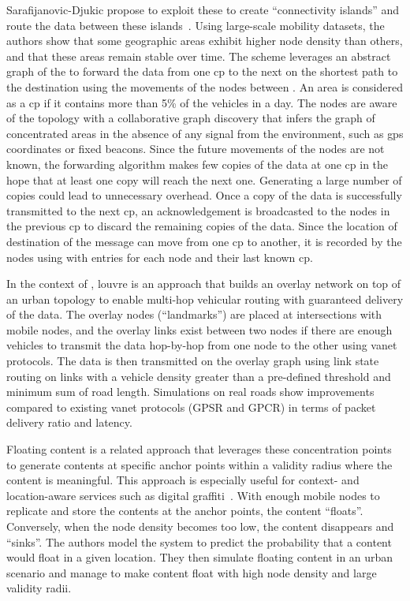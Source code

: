 Sarafijanovic-Djukic \etal propose to exploit these  to create ``connectivity islands'' and route the data between these islands~\cite{sarafijanovic2006island}. Using large-scale mobility datasets, the authors show that some geographic areas exhibit higher node density than others, and that these areas remain stable over time. The scheme leverages an abstract graph of the  to forward the data from one \acrshort{cp} to the next on the shortest path to the destination using the movements of the nodes between . An area is considered as a \acrshort{cp} if it contains more than 5\% of the vehicles in a day. The nodes are aware of the topology with a collaborative graph discovery that infers the graph of concentrated areas in the absence of any signal from the environment, such as \acrshort{gps} coordinates or fixed beacons. Since the future movements of the nodes are not known, the forwarding algorithm makes few copies of the data at one \acrshort{cp} in the hope that at least one copy will reach the next one. Generating a large number of copies could lead to unnecessary overhead. Once a copy of the data is successfully transmitted to the next \acrshort{cp}, an acknowledgement is broadcasted to the nodes in the previous \acrshort{cp} to discard the remaining copies of the data. Since the location of destination of the message can move from one \acrshort{cp} to another, it is recorded by the nodes using  with entries for each node and their last known \acrshort{cp}.

In the context of , \acrshort{louvre} is an approach that builds an overlay network on top of an urban topology to enable multi-hop vehicular routing with guaranteed delivery of the data. The overlay nodes (``landmarks'') are placed at intersections with mobile nodes, and the overlay links exist between two nodes if there are enough vehicles to transmit the data hop-by-hop from one node to the other using \acrshort{vanet} protocols. The data is then transmitted on the overlay graph using link state routing on links with a vehicle density greater than a pre-defined threshold and minimum sum of road length. Simulations on real roads show improvements compared to existing \acrshort{vanet} protocols (GPSR and GPCR) in terms of packet delivery ratio and latency.

Floating content is a related approach that leverages these concentration points to generate contents at specific anchor points within a validity radius where the content is meaningful. This approach is especially useful for context- and location-aware services such as digital graffiti~\cite{carter2004digital}. With enough mobile nodes to replicate and store the contents at the anchor points, the content ``floats''. Conversely, when the node density becomes too low, the content disappears and ``sinks''. The authors model the system to predict the probability that a content would float in a given location. They then simulate floating content in an urban scenario and manage to make content float with high node density and large validity radii.


